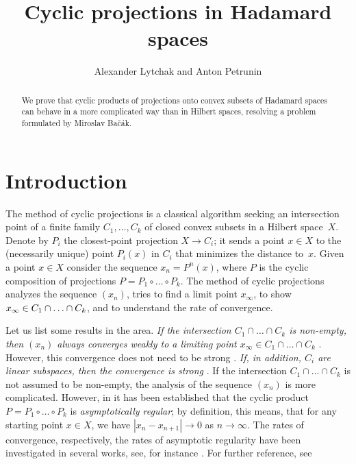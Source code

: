 \documentclass[a4paper,10pt]{article}
\def\thetitle{Cyclic projections in Hadamard spaces}
\def\theauthors{Alexander Lytchak and Anton Petrunin}
\begin{document}


\title{\thetitle}	
\author{\theauthors}
\date{}
\maketitle

\begin{abstract}
We  prove that cyclic products of  projections onto convex subsets of Hadamard spaces can behave in a more complicated way than in Hilbert spaces, resolving a problem formulated by Miroslav Bačák.
\end{abstract}


\section{Introduction}

The method of cyclic  projections is a classical algorithm seeking  an intersection point of a finite family  $C_1,\dots, C_k$ of  closed convex subsets in a Hilbert  space~$X$.
Denote by $P_i$ the closest-point projection $X\to C_i$; it sends a point $x\in X$ to the (necessarily unique) point $P_i(x)$ in $C_i$ that minimizes the distance to~$x$.
Given a point $x\in X$ consider the sequence $x_n=P^n(x)$, where
$P$ is the  cyclic composition of projections $P= P_1\circ \dots \circ P_k$.  The method of cyclic projections analyzes the sequence $(x_n)$, tries to find a limit point $x_{\infty}$, to show $x_{\infty} \in C_1\cap\z\dots\cap C_k$, and to understand the  rate of convergence.

Let us list some results in the area.
\emph{If the intersection  $C_1\cap \dots\cap C_k$ is non-empty, then $(x_n)$ always converges weakly to a limiting point $x_{\infty} \in  C_1\cap \dots\cap C_k$} \cite{bregman}.
However, this convergence does not need to be strong \cite{hundal}.
\emph{If, in addition,  $C_i$ are  linear subspaces, then the convergence is strong} \cite{vonneumann,halperin}.
If the intersection  $C_1\cap \dots\cap C_k$ is not assumed to be non-empty,  the analysis of the sequence $(x_n)$ is more complicated.
However, in \cite{bauschke} it has been established that the cyclic product $P= P_1\circ \dots \circ P_k$ is \emph{asymptotically regular};
by definition, this means, that for any starting point  $x\in X$, we have  $|x_n-x_{n+1}|\to 0$ as $n\to \infty$.
The rates of convergence, respectively, the rates of asymptotic regularity have been investigated in several works, see, for instance \cite{bauschke-borwein-lewis, Kohlenbach}.
For further reference, see \cite{bauschke-borwein-lewis, deutsch, Bac, Bac2}
\end{document}
